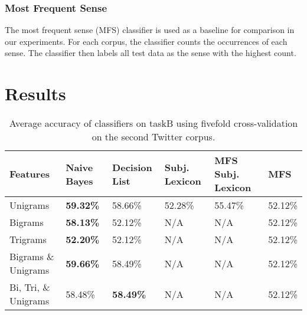 \documentclass[11pt]{article}
\begin{document}
\subsubsection*{Most Frequent Sense}
The most frequent sense (MFS) classifier is used as a baseline for comparison in our experiments. For each corpus, the classifier counts the occurrences of each sense. The classifier then labels all test data as the sense with the highest count.

\section{Results}
\begin{table*}[htb!]
  \centering
  \begin{tabular}{| l || l | l | l | l | l |}
  \hline
  Features & Naive Bayes & Decision List & Subj. Lexicon & MFS Subj. Lexicon & MFS \\ 
  \hline \hline
  Unigrams              & \bf{59.32}\%      & 58.66\% & 52.28\% & 55.47\% 
                        & 52.12\% \\  \hline
  Bigrams               & \bf{58.13}\%      & 52.12\%      & N/A          
                        & N/A          & 52.12\% \\  \hline
  Trigrams              & \bf{52.20}\%      & 52.12\%      & N/A          
                        & N/A          & 52.12\% \\  \hline
  Bigrams \& Unigrams   & \bf{59.66}\% & 58.49\%      & N/A          
           & N/A          & 52.12\% \\  \hline
  Bi, Tri, \& Unigrams  & 58.48\%      & \bf{58.49}\%      & N/A          
           & N/A          & 52.12\% \\  \hline
  \end{tabular}
  \caption{Average accuracy of classifiers on taskB using fivefold cross-validation on the second Twitter corpus.}
\end{table*}
\end{document}
